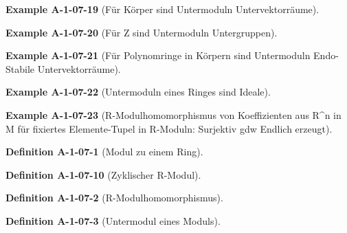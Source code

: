 \documentclass[10pt, letterpaper]{article}
\newcommand{\CustomHeading}[3]{%
  \par\medskip\noindent%
  \textbf{#1 #2} \textnormal{(#3)}.\enskip%
}
\newenvironment{DEF}[2]{\CustomHeading{Definition}{#1}{#2}}{}
\newenvironment{EXA}[2]{\CustomHeading{Example}{#1}{#2}}{}
\begin{document}
\begin{EXA}{A-1-07-19}{Für Körper sind Untermoduln Untervektorräume}

\end{EXA}

\begin{EXA}{A-1-07-20}{Für Z sind Untermoduln Untergruppen}

\end{EXA}

\begin{EXA}{A-1-07-21}{Für Polynomringe in Körpern sind Untermoduln Endo-Stabile Untervektorräume}

\end{EXA}

\begin{EXA}{A-1-07-22}{Untermoduln eines Ringes sind Ideale}

\end{EXA}

\begin{EXA}{A-1-07-23}{R-Modulhomomorphismus von Koeffizienten aus R^n in M für fixiertes Elemente-Tupel in R-Moduln: Surjektiv gdw Endlich erzeugt}

\end{EXA}





























\begin{DEF}{A-1-07-1}{Modul zu einem Ring}

\end{DEF}

\begin{DEF}{A-1-07-10}{Zyklischer R-Modul}

\end{DEF}

\begin{DEF}{A-1-07-2}{R-Modulhomomorphismus}

\end{DEF}

\begin{DEF}{A-1-07-3}{Untermodul eines Moduls}

\end{DEF}
\end{document}
